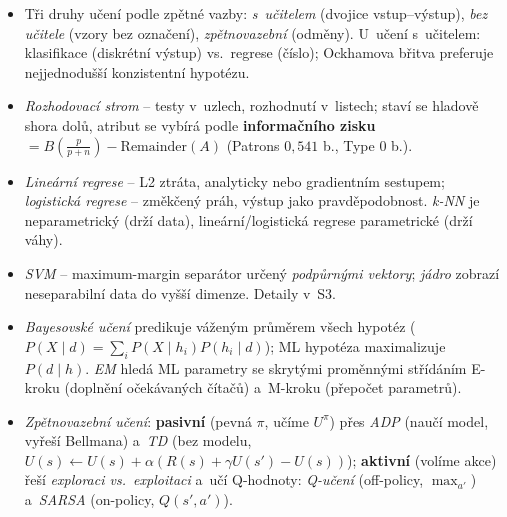 \begin{poznamka}[Co si odnést]
\begin{itemize}
  \item Tři druhy učení podle zpětné vazby: \emph{s~učitelem} (dvojice vstup--výstup), \emph{bez učitele} (vzory bez označení), \emph{zpětnovazební} (odměny). U~učení s~učitelem: klasifikace (diskrétní výstup) vs.\ regrese (číslo); Ockhamova břitva preferuje nejjednodušší konzistentní hypotézu.
  \item \emph{Rozhodovací strom} -- testy v~uzlech, rozhodnutí v~listech; staví se hladově shora dolů, atribut se vybírá podle \textbf{informačního zisku} $=B(\tfrac{p}{p+n})-\mathrm{Remainder}(A)$ (Patrons $0{,}541$ b., Type $0$ b.).
  \item \emph{Lineární regrese} -- L2 ztráta, analyticky nebo gradientním sestupem; \emph{logistická regrese} -- změkčený práh, výstup jako pravděpodobnost. \emph{k-NN} je neparametrický (drží data), lineární/logistická regrese parametrické (drží váhy).
  \item \emph{SVM} -- maximum-margin separátor určený \emph{podpůrnými vektory}; \emph{jádro} zobrazí neseparabilní data do vyšší dimenze. Detaily v~S3.
  \item \emph{Bayesovské učení} predikuje váženým průměrem všech hypotéz ($P(X\mid d)=\sum_i P(X\mid h_i)P(h_i\mid d)$); ML hypotéza maximalizuje $P(d\mid h)$. \emph{EM} hledá ML parametry se skrytými proměnnými střídáním E-kroku (doplnění očekávaných čítačů) a~M-kroku (přepočet parametrů).
  \item \emph{Zpětnovazební učení}: \textbf{pasivní} (pevná $\pi$, učíme $U^{\pi}$) přes \emph{ADP} (naučí model, vyřeší Bellmana) a~\emph{TD} (bez modelu, $U(s)\!\leftarrow\!U(s)+\alpha(R(s)+\gamma U(s')-U(s))$); \textbf{aktivní} (volíme akce) řeší \emph{exploraci vs.\ exploitaci} a~učí Q-hodnoty: \emph{Q-učení} (off-policy, $\max_{a'}$) a~\emph{SARSA} (on-policy, $Q(s',a')$).
\end{itemize}
\end{poznamka}
